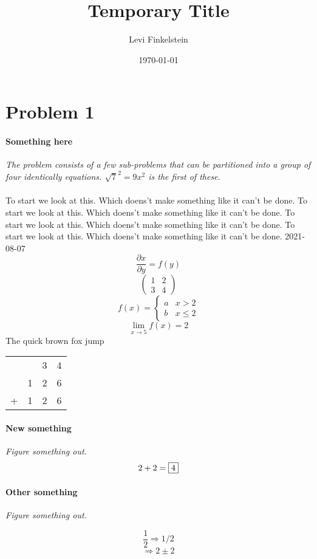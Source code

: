 \documentclass[12pt,english]{article}
\title{Temporary Title}
\author{Levi Finkelstein}
\date{\today}
\begin{document}
\maketitle

\section*{Problem 1}

\paragraph{Something here} 
\textit{The problem consists of a few sub-problems that can be partitioned into a group of four identically equations. $\sqrt{7}^2 = 9x^2$ is the first of these.}\\\\
To start we look at this. Which doens't make something like it can't be done.
To start we look at this. Which doens't make something like it can't be done.
To start we look at this. Which doens't make something like it can't be done.
To start we look at this. Which doens't make something like it can't be done.
2021-08-07
$$\frac{\partial x}{\partial y} = f(y)$$
$$\begin{pmatrix}
    1&2\\3&4
\end{pmatrix}$$
$$f(x)=\begin{cases}
    a&x>2\\b&x\leq2
\end{cases}$$
$$\lim_{x\to5}f(x)=2$$
The quick brown fox jump
\begin{center}
    \begin{tabular}{cccc}
            & & 3 & 4 \\
            & 1 & 2 & 6 \\
            \hline
        + & 1 & 2 & 6 \\
    \end{tabular}
\end{center}
\newpage

\paragraph{New something}
\textit{ Figure something out.}
$$2+2=\framebox{$4$}$$

\paragraph{Other something}
\textit{ Figure something out.}

$$\frac{1}{2} \Rightarrow 1/2$$
$$\Rightarrow 2\pm2$$
\end{document}

